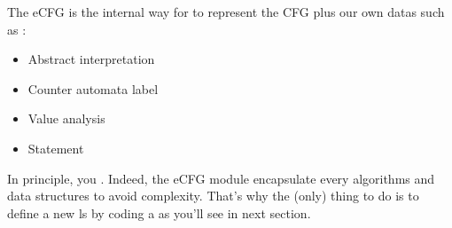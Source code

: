 The \gls{eCFG} is the internal way for \flatac to represent the  \gls{CFG} plus our own datas such as :
\begin{itemize}
	\item Abstract interpretation
	\item Counter automata label
	\item Value analysis
	\item Statement
\end{itemize}


In principle, you . Indeed, the \gls{eCFG} module encapsulate every algorithms and data structures to avoid complexity. That's why the (only) thing to do is to define a new \gls{ls} by coding a  as you'll see in next section.
